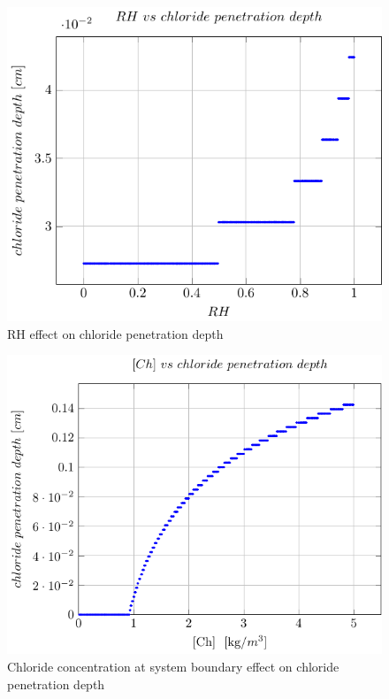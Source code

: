 \begin{figure}[H]
    \centering
    \includegraphics[scale=0.7]{imgs/pdfs/11_RH_corr.pdf}
    \caption{RH effect on chloride penetration depth}\label{RH vs chloride depth}
\end{figure}
\begin{figure}[H]
    \centering
    \includegraphics[scale=0.7]{imgs/pdfs/11_Chloride_corr.pdf}
    \caption{Chloride concentration at system boundary effect on chloride penetration depth}\label{Chloride vs corrosion depth}
\end{figure}

